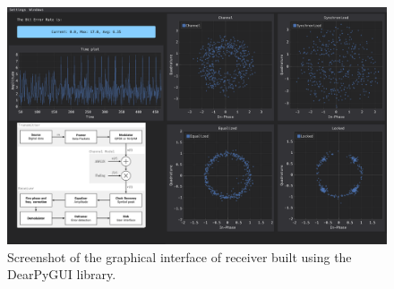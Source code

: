 \begin{figure}
	\centering
	\includegraphics[frame, width = \linewidth]{figures/screenshots/gui_screenshot}
	\caption{Screenshot of the graphical interface of receiver built using the DearPyGUI library.}
\end{figure}
